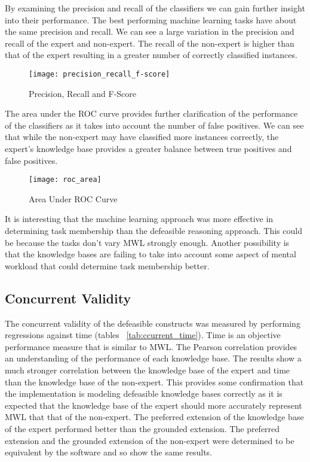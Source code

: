 By examining the precision and recall of the classifiers we can gain further insight into their performance. The best performing machine learning tasks have about the same precision and recall. We can see a large variation in the precision and recall of the expert and non-expert. The recall of the non-expert is higher than that of the expert resulting in a greater number of correctly classified instances.

\begin{figure}[!h]
\centering
\texttt{[image: precision\_recall\_f-score]}
\caption{Precision, Recall and F-Score}
\label{fig:precision_recall_f-score}
\end{figure}

The area under the ROC curve provides further clarification of the performance of the classifiers as it takes into account the number of false positives. We can see that while the non-expert may have classified more instances correctly, the expert's knowledge base provides a greater balance between true positives and false positives.  

\begin{figure}[!h]
\centering
\texttt{[image: roc\_area]}
\caption{Area Under ROC Curve}
\label{fig:precision_and_recall}
\end{figure}

It is interesting that the machine learning approach was more effective in determining task membership than the defeasible reasoning approach. This could be because the tasks don't vary MWL strongly enough. Another possibility is that the knowledge bases are failing to take into account some aspect of mental workload that could determine task membership better.

\subsection{Concurrent Validity}

The concurrent validity of the defeasible constructs was measured by performing regressions against time (tables ~\ref{tab:ccurrent_time}). Time is an objective performance measure that is similar to MWL. The Pearson correlation provides an understanding of the performance of each knowledge base. The results show a much stronger correlation between the knowledge base of the expert and time than the knowledge base of the non-expert. This provides some confirmation that the implementation is modeling defeasible knowledge bases correctly as it is expected that the knowledge base of the expert should more accurately represent MWL that that of the non-expert. The preferred extension of the knowledge base of the expert performed better than the grounded extension. The preferred extension and the grounded extension of the non-expert were determined to be equivalent by the software and so show the same results.

